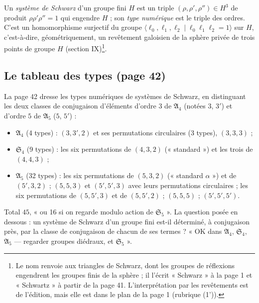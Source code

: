 \documentclass[11pt,a4paper]{article}
\begin{document}
Un \emph{système de Schwarz} d'un groupe fini $H$ est un triple $(\rho, \rho',
\rho'') \in H^3$ de produit $\rho\rho'\rho'' = 1$ qui engendre $H$ ; son
\emph{type numérique} est le triple des ordres. C'est un homomorphisme
surjectif du groupe $\langle \ell_0, \ell_1, \ell_2 \mid \ell_0\ell_1\ell_2 =
1\rangle$ sur $H$, c'est-à-dire, géométriquement, un revêtement galoisien de
la sphère privée de trois points de groupe $H$ (section IX)\footnote{Le nom
renvoie aux triangles de Schwarz, dont les groupes de réflexions engendrent
les groupes finis de la sphère ; il l'écrit « Schwarz » à la page 1 et
« Schwartz » à partir de la page 41. L'interprétation par les revêtements est
de l'édition, mais elle est dans le plan de la page 1 (rubrique (1')).}.

\subsection*{Le tableau des types (page 42)}

La page 42 dresse les types numériques de systèmes de Schwarz, en
distinguant les deux classes de conjugaison d'éléments d'ordre $3$ de
$\mathfrak{A}_4$ (notées $3$, $3'$) et d'ordre $5$ de $\mathfrak{A}_5$ ($5$,
$5'$) :
\begin{itemize}
  \item $\mathfrak{A}_4$ (4 types) : $(3, 3', 2)$ et ses permutations
    circulaires (3 types), $(3, 3, 3)$ ;
  \item $\mathfrak{S}_4$ (9 types) : les six permutations de $(4, 3, 2)$
    (« standard ») et les trois de $(4, 4, 3)$ ;
  \item $\mathfrak{A}_5$ (32 types) : les six permutations de $(5, 3, 2)$
    (« standard $\alpha$ ») et de $(5', 3, 2)$ ; $(5, 5, 3)$ et $(5', 5', 3)$
    avec leurs permutations circulaires ; les six permutations de $(5, 5', 3)$
    et de $(5, 5', 2)$ ; $(5, 5, 5)$ ; $(5', 5', 5')$.
\end{itemize}
Total $45$, « ou 16 si on regarde modulo action de $\mathfrak{S}_5$ ». La
question posée en dessous : un système de Schwarz d'un groupe fini est-il
déterminé, à conjugaison près, par la classe de conjugaison de chacun de ses
termes ? « OK dans $\mathfrak{A}_4$, $\mathfrak{S}_4$, $\mathfrak{A}_5$ ---
regarder groupes diédraux, et $\mathfrak{S}_5$ ».
\end{document}
